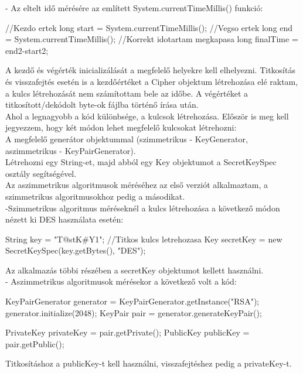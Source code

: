 \vspace{5pt}- Az eltelt idő mérésére az említett System.currentTimeMillis() funkció:
\begin{java}
//Kezdo ertek
long start = System.currentTimeMillis();
//Vegso ertek
long end = System.currentTimeMillis();	
//Korrekt idotartam megkapasa
long finalTime = end2-start2;	
\end{java}
A kezdő és végérték inicializálását a megfelelő helyekre kell elhelyezni. Titkosítás és visszafejtés esetén is a kezdőértéket a Cipher objektum létrehozása elé raktam, a kulcs létrehozását nem számítottam bele az időbe. A végértéket a titkosított/dekódolt byte-ok fájlba történő írása után.
\vspace{15pt} \\Ahol a legnagyobb a kód különbsége, a kulcsok létrehozása. Először is meg kell jegyezzem, hogy két módon lehet megfelelő kulcsokat létrehozni:
\vspace{5pt}\\ A megfelelő generátor objektummal (szimmetrikus - KeyGenerator, aszimmetrikus - KeyPairGenerator).
\vspace{5pt}\\ Létrehozni egy String-et, majd abból egy Key objektumot a SecretKeySpec osztály segítségével.
\vspace{5pt}\\Az aszimmetrikus algoritmusok méréséhez az első verziót alkalmaztam, a szimmetrikus algoritmusokhoz pedig a másodikat.
\vspace{5pt}\\ \noindent -Szimmetrikus algoritmus méréseknél a kulcs létrehozása a következő módon nézett ki DES használata esetén:
\begin{java}
String key = "T@stK#Y1";
//Titkos kulcs letrehozasa
Key secretKey = new SecretKeySpec(key.getBytes(), "DES");
\end{java}
Az alkalmazás többi részében a secretKey objektumot kellett használni.
\vspace{7pt}\\- Aszimmetrikus algoritmusok mérésekor a következő volt a kód:
\begin{java}
KeyPairGenerator generator = 
			KeyPairGenerator.getInstance("RSA");
generator.initialize(2048);
KeyPair pair = generator.generateKeyPair();
	
PrivateKey privateKey = pair.getPrivate();
PublicKey publicKey = pair.getPublic();
\end{java}
Titkosításhoz a publicKey-t kell használni, visszafejtéshez pedig a privateKey-t.


